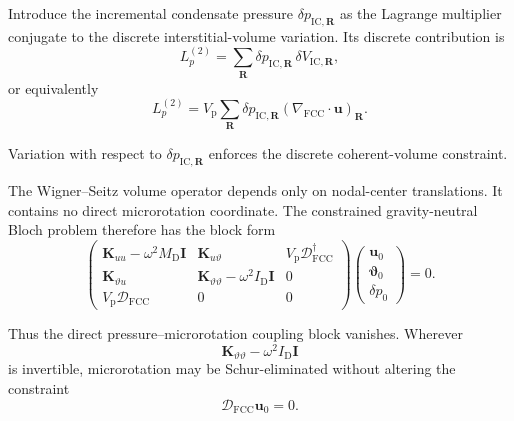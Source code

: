 Introduce the incremental condensate pressure $\delta p_{\mathrm{IC},\mathbf{R}}$ as the Lagrange multiplier conjugate to the discrete interstitial-volume variation. Its discrete contribution is
\begin{equation}
    L_p^{(2)}
    =
    \sum_{\mathbf{R}}
    \delta p_{\mathrm{IC},\mathbf{R}}
    \,
    \delta V_{\mathrm{IC},\mathbf{R}},
\end{equation}
or equivalently
\begin{equation}
    L_p^{(2)}
    =
    V_{\mathrm{p}}
    \sum_{\mathbf{R}}
    \delta p_{\mathrm{IC},\mathbf{R}}
    \left(
        \nabla_{\mathrm{FCC}}
        \cdot
        \mathbf{u}
    \right)_{\mathbf{R}}.
\end{equation}

Variation with respect to $\delta p_{\mathrm{IC},\mathbf{R}}$ enforces the discrete coherent-volume constraint.

The Wigner--Seitz volume operator depends only on nodal-center translations. It contains no direct microrotation coordinate. The constrained gravity-neutral Bloch problem therefore has the block form
\begin{equation}
    \begin{pmatrix}
        \mathbf{K}_{uu}-\omega^2M_{\mathrm{D}}\mathbf{I}
        &
        \mathbf{K}_{u\vartheta}
        &
        V_{\mathrm{p}}\mathcal{D}_{\mathrm{FCC}}^{\dagger}
        \\
        \mathbf{K}_{\vartheta u}
        &
        \mathbf{K}_{\vartheta\vartheta}
        -
        \omega^2I_{\mathrm{D}}\mathbf{I}
        &
        0
        \\
        V_{\mathrm{p}}\mathcal{D}_{\mathrm{FCC}}
        &
        0
        &
        0
    \end{pmatrix}
    \begin{pmatrix}
        \mathbf{u}_0\\
        \boldsymbol{\vartheta}_0\\
        \delta p_0
    \end{pmatrix}
    =
    0.
\end{equation}

Thus the direct pressure--microrotation coupling block vanishes. Wherever
\begin{equation}
    \mathbf{K}_{\vartheta\vartheta}
    -
    \omega^2I_{\mathrm{D}}\mathbf{I}
\end{equation}
is invertible, microrotation may be Schur-eliminated without altering the constraint
\begin{equation}
    \mathcal{D}_{\mathrm{FCC}}\mathbf{u}_0
    =
    0.
\end{equation}


